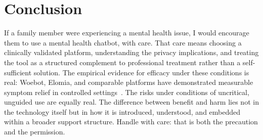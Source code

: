 \documentclass[11pt,showkeys]{essay}
\begin{document}
\section{Conclusion}

If a family member were experiencing a mental health issue, I would encourage them to use a mental health chatbot, with care. That care means choosing a clinically validated platform, understanding the privacy implications, and treating the tool as a structured complement to professional treatment rather than a self-sufficient solution. The empirical evidence for efficacy under these conditions is real: Woebot, Elomia, and comparable platforms have demonstrated measurable symptom relief in controlled settings~\cite{fitzpatrick_woebot_2017,romanovskyi_elomia_2021}. The risks under conditions of uncritical, unguided use are equally real. The difference between benefit and harm lies not in the technology itself but in how it is introduced, understood, and embedded within a broader support structure. Handle with care: that is both the precaution and the permission.


\end{document}
